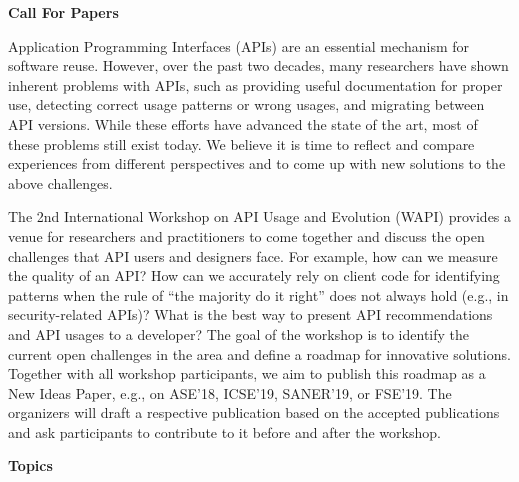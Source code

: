 \documentclass[10pt, conference]{IEEEtran}
\newcommand{\shortname}{WAPI}
\begin{document}



\newpage
\onecolumn

\begin{center}
\Large{\textbf{Call For Papers}}
\end{center}

Application Programming Interfaces (APIs) are an essential mechanism for software reuse. However, over the past two decades, many researchers have shown inherent problems with APIs, such as providing useful documentation for proper use, detecting correct usage patterns or wrong usages, and migrating between API versions. While these efforts have advanced the state of the art, most of these problems still exist today. We believe it is time to reflect and compare experiences from different perspectives and to come up with new solutions to the above challenges. 

The 2nd International Workshop on API Usage and Evolution (\shortname{}) provides a venue for researchers and practitioners to come together and discuss the open challenges that API users and designers face. For example, how can we measure the quality of an API\@? How can we accurately rely on client code for identifying patterns when the rule of ``the majority do it right'' does not always hold (e.g., in security-related APIs)? What is the best way to present API recommendations and API usages to a developer? The goal of the workshop is to identify the current open challenges in the area and define a roadmap for innovative solutions. Together with all workshop participants, we aim to publish this roadmap as a New Ideas Paper, e.g., on ASE'18, ICSE'19, SANER'19, or FSE'19. The organizers will draft a respective publication based on the accepted publications and ask participants to contribute to it before and after the workshop.


\vspace{0.2cm}

\noindent
\textbf{\large Topics}
\vspace{0.2cm}
\end{document}

